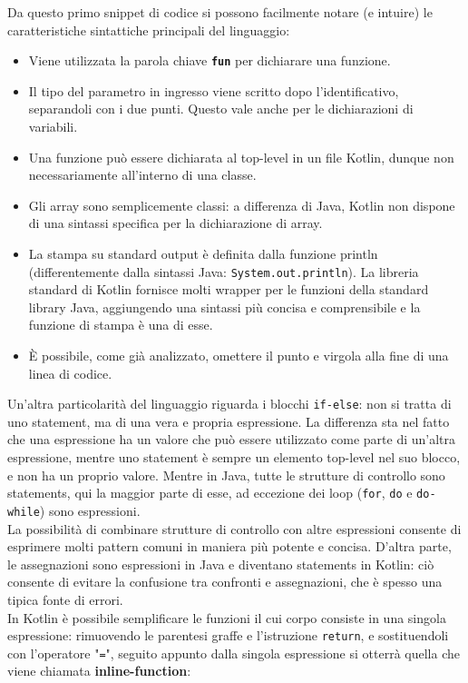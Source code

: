 Da questo primo snippet di codice si possono facilmente notare (e intuire) le caratteristiche sintattiche principali del linguaggio:
\begin{itemize}
  \item Viene utilizzata la parola chiave {\bfseries \texttt{fun}} per dichiarare una funzione.
  \item Il tipo del parametro in ingresso viene scritto dopo l’identificativo, separandoli con i due punti. Questo vale anche per le dichiarazioni di variabili.
  \item Una funzione può essere dichiarata al top-level in un file Kotlin, dunque non necessariamente all’interno di una classe.
  \item Gli array sono semplicemente classi: a differenza di Java, Kotlin non dispone di una sintassi specifica per la dichiarazione di array.
  \item La stampa su standard output è definita dalla funzione println (differentemente dalla sintassi Java: \texttt{System.out.println}). La libreria standard di Kotlin fornisce molti wrapper per le funzioni della standard library Java, aggiungendo una sintassi più concisa e comprensibile e la funzione di stampa è una di esse.
  \item È possibile, come già analizzato, omettere il punto e virgola alla fine di una linea di codice.
\end{itemize}

Un’altra particolarità del linguaggio riguarda i blocchi \texttt{if-else}: non si tratta di uno statement, ma di una vera e propria espressione. La differenza sta nel fatto che una espressione ha un valore che può
essere utilizzato come parte di un'altra espressione, mentre uno statement è sempre un elemento top-level nel suo blocco, e non ha un proprio valore. Mentre in Java, tutte le strutture di controllo sono statements, qui la maggior parte di esse, ad eccezione dei loop (\texttt{for}, \texttt{do} e \texttt{do-while}) sono espressioni.\\
La possibilità di combinare strutture di controllo con altre espressioni consente di esprimere molti pattern comuni in maniera più potente e concisa. D'altra parte, le assegnazioni sono espressioni in Java e diventano statements in Kotlin: ciò consente di evitare la confusione tra confronti e assegnazioni, che è spesso una tipica fonte di errori.\\
In Kotlin è possibile semplificare le funzioni il cui corpo consiste in una singola espressione: rimuovendo le parentesi graffe e l'istruzione \texttt{return}, e sostituendoli con l'operatore "\texttt{=}", seguito appunto dalla singola espressione si otterrà quella che viene chiamata {\bfseries inline-function}:\\

